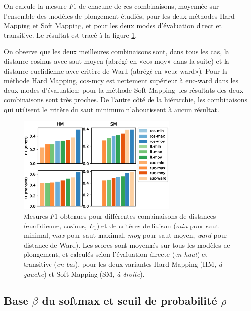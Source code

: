On calcule la mesure $F1$ de chacune de ces combinaisons, moyennée sur l'ensemble des modèles de plongement étudiés, pour les deux méthodes Hard Mapping et Soft Mapping, et pour les deux modes d'évaluation direct et transitive. Le résultat est tracé à la figure \ref{fig:taxex-cluparams-all}.

On observe que les deux meilleures combinaisons sont, dans tous les cas, la distance cosinus avec saut moyen (abrégé en «cos-moy» dans la suite) et la distance euclidienne avec critère de Ward (abrégé en «euc-ward»). Pour la méthode Hard Mapping, cos-moy est nettement supérieur à euc-ward dans les deux modes d'évaluation; pour la méthode Soft Mapping, les résultats des deux combinaisons sont très proches. De l'autre côté de la hiérarchie, les combinaisons qui utilisent le critère du saut minimum n'aboutissent à aucun résultat. 

\begin{figure}[h]
    \centering
    \includegraphics[width=0.7\textwidth]{fig/plot/taxex_cluparams-all.eps}
    \caption[Influence des paramètres de regroupement sur l'extraction de taxonomie]{Mesures $F1$ obtenues pour différentes combinaisons de distances (euclidienne, cosinus, $L_1$) et de critères de liaison (\textit{min} pour saut minimal, \textit{max} pour saut maximal, \textit{moy} pour saut moyen, \textit{ward} pour distance de Ward). Les scores sont moyennés sur tous les modèles de plongement, et calculés selon l'évaluation directe (\textit{en haut}) et transitive (\textit{en bas}), pour les deux variantes Hard Mapping (HM, \textit{à gauche}) et Soft Mapping (SM, \textit{à droite}).}
    \label{fig:taxex-cluparams-all}
\end{figure}

\subsection{Base \texorpdfstring{$\beta$}{beta} du softmax et seuil de probabilité \texorpdfstring{$\rho$}{rho}}
\label{subsec:te-hp-beta}

